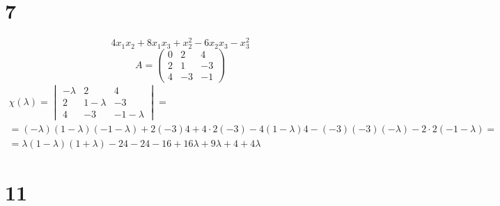 \section{7}

$$ 4x_1x_2 + 8x_1x_3 + x_2^2 - 6x_2x_3 - x_3^2 $$
$$ A =
\begin{pmatrix}
	0 & 2 & 4 \\
    2 & 1 & -3 \\
    4 & -3 & -1
\end{pmatrix} $$
\begin{multline*}
    \chi(\lambda) =
    \begin{vmatrix}
        -\lambda & 2 & 4 \\
        2 & 1 - \lambda & -3 \\
        4 & -3 & -1 - \lambda
    \end{vmatrix} = \\
    = (-\lambda)(1 - \lambda)(-1 - \lambda) + 2(-3)4 + 4 \cdot 2(-3) - 4(1 - \lambda)4 - (-3)(-3)(-\lambda) - 2 \cdot 2 (-1 - \lambda) = \\
    = \lambda(1 - \lambda)(1 + \lambda) - 24 - 24 - 16 + 16\lambda + 9\lambda + 4 + 4\lambda
\end{multline*}

\section{11}

